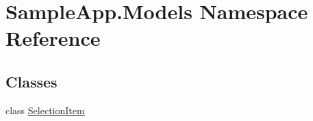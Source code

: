 \hypertarget{namespace_sample_app_1_1_models}{}\section{Sample\+App.\+Models Namespace Reference}
\label{namespace_sample_app_1_1_models}
\subsection*{Classes}
\begin{DoxyCompactItemize}
\item 
class \hyperlink{class_sample_app_1_1_models_1_1_selection_item}{Selection\+Item}
\end{DoxyCompactItemize}
